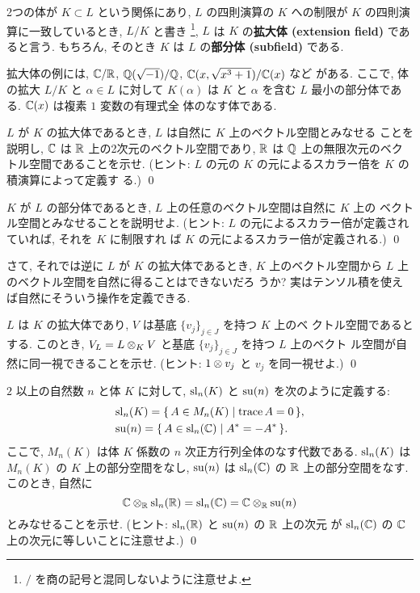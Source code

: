 \documentclass[12pt,twoside]{jarticle}
\begin{document}
2つの体が $K\subset L$ という関係にあり, $L$ の四則演算の $K$ への制限が $K$ 
の四則演算に一致しているとき, $L/K$ と書き%
\footnote{$/$ を商の記号と混同しないように注意せよ.},
$L$ は $K$ の{\bf 拡大体 (extension field)} であると言う.
もちろん, そのとき $K$ は $L$ の{\bf 部分体 (subfield)} である.

拡大体の例には, ${\mathbb C}/{\mathbb R}$, ${\mathbb Q}(\sqrt{-1})/{\mathbb Q}$, ${\mathbb C}(x,\sqrt{x^3+1})/{\mathbb C}(x)$ など
がある. ここで, 体の拡大 $L/K$ と $\alpha\in L$ に対して $K(\alpha)$ は $K$ 
と $\alpha$ を含む $L$ 最小の部分体である. ${\mathbb C}(x)$ は複素 $1$ 変数の有理式全
体のなす体である.

\begin{question}
  $L$ が $K$ の拡大体であるとき, $L$ は自然に $K$ 上のベクトル空間とみなせる
  ことを説明し,
  ${\mathbb C}$ は ${\mathbb R}$ 上の2次元のベクトル空間であり,
  ${\mathbb R}$ は ${\mathbb Q}$ 上の無限次元のベクトル空間であることを示せ.
  (ヒント: $L$ の元の $K$ の元によるスカラー倍を $K$ の積演算によって定義す
  る.)
  \qed
\end{question}

\begin{question}
  $K$ が $L$ の部分体であるとき, $L$ 上の任意のベクトル空間は自然に $K$ 上の
  ベクトル空間とみなせることを説明せよ. 
  (ヒント: $L$ の元によるスカラー倍が定義されていれば, それを $K$ に制限すれ
  ば $K$ の元によるスカラー倍が定義される.) \qed
\end{question}

さて, それでは逆に $L$ が $K$ の拡大体であるとき, 
$K$ 上のベクトル空間から $L$ 上のベクトル空間を自然に得ることはできないだろ
うか?  実はテンソル積を使えば自然にそういう操作を定義できる.

\begin{question}
  $L$ は $K$ の拡大体であり, $V$ は基底 $\{v_j\}_{j\in J}$ を持つ $K$ 上のベ
  クトル空間であるとする. 
  このとき, $V_L = L\otimes_K V$ と基底 $\{v_j\}_{j\in J}$ を持つ $L$ 上のベクト
  ル空間が自然に同一視できることを示せ.
  (ヒント: $1\otimes v_j$ と $v_j$ を同一視せよ.)
  \qed
\end{question}

\begin{question}
  $2$ 以上の自然数 $n$ と体 $K$ に対して, 
  $\mathrm{sl}_n(K)$ と $\mathrm{su}(n)$ を次のように定義する:
  \begin{align*}
    &
    \mathrm{sl}_n(K) = \{\, A\in M_n(K) \mid \mathop{\mathrm{trace}}\nolimits A = 0 \,\}, 
    \\ &
    \mathrm{su}(n) = \{\, A\in \mathrm{sl}_n({\mathbb C}) \mid A^* = - A^* \,\}.
  \end{align*}
  ここで, $M_n(K)$ は体 $K$ 係数の $n$ 次正方行列全体のなす代数である.
  $\mathrm{sl}_n(K)$ は $M_n(K)$ の $K$ 上の部分空間をなし,
  $\mathrm{su}(n)$ は $\mathrm{sl}_n({\mathbb C})$ の ${\mathbb R}$ 上の部分空間をなす.
  このとき, 自然に
  \begin{equation*}
    {\mathbb C}\otimes_{\mathbb R}\mathrm{sl}_n({\mathbb R}) = \mathrm{sl}_n({\mathbb C}) = {\mathbb C}\otimes_{\mathbb R}\mathrm{su}(n)
  \end{equation*}
  とみなせることを示せ. 
  (ヒント: $\mathrm{sl}_n({\mathbb R})$ と $\mathrm{su}(n)$ の ${\mathbb R}$ 上の次元
  が $\mathrm{sl}_n({\mathbb C})$ の ${\mathbb C}$ 上の次元に等しいことに注意せよ.) \qed
\end{question}
\end{document}
